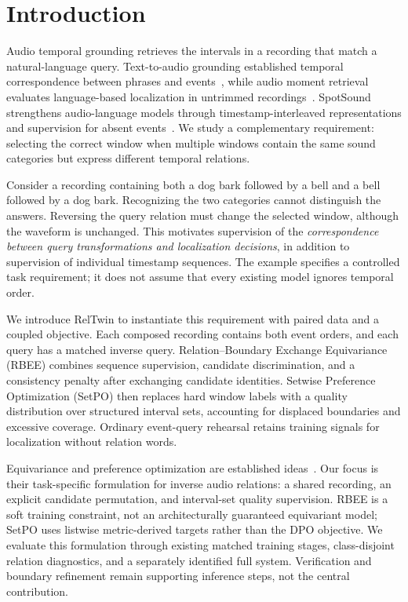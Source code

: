 \section{Introduction}
Audio temporal grounding retrieves the intervals in a recording that match a natural-language query. Text-to-audio grounding established temporal correspondence between phrases and events~\cite{xu2021grounding}, while audio moment retrieval evaluates language-based localization in untrimmed recordings~\cite{munakata2025amr}. SpotSound strengthens audio-language models through timestamp-interleaved representations and supervision for absent events~\cite{sun2026spotsound}. We study a complementary requirement: selecting the correct window when multiple windows contain the same sound categories but express different temporal relations.

Consider a recording containing both a dog bark followed by a bell and a bell followed by a dog bark. Recognizing the two categories cannot distinguish the answers. Reversing the query relation must change the selected window, although the waveform is unchanged. This motivates supervision of the \emph{correspondence between query transformations and localization decisions}, in addition to supervision of individual timestamp sequences. The example specifies a controlled task requirement; it does not assume that every existing model ignores temporal order.

We introduce RelTwin to instantiate this requirement with paired data and a coupled objective. Each composed recording contains both event orders, and each query has a matched inverse query. Relation--Boundary Exchange Equivariance (RBEE) combines sequence supervision, candidate discrimination, and a consistency penalty after exchanging candidate identities. Setwise Preference Optimization (SetPO) then replaces hard window labels with a quality distribution over structured interval sets, accounting for displaced boundaries and excessive coverage. Ordinary event-query rehearsal retains training signals for localization without relation words.

Equivariance and preference optimization are established ideas~\cite{cohen2016group,rafailov2023dpo}. Our focus is their task-specific formulation for inverse audio relations: a shared recording, an explicit candidate permutation, and interval-set quality supervision. RBEE is a soft training constraint, not an architecturally guaranteed equivariant model; SetPO uses listwise metric-derived targets rather than the DPO objective. We evaluate this formulation through existing matched training stages, class-disjoint relation diagnostics, and a separately identified full system. Verification and boundary refinement remain supporting inference steps, not the central contribution.
